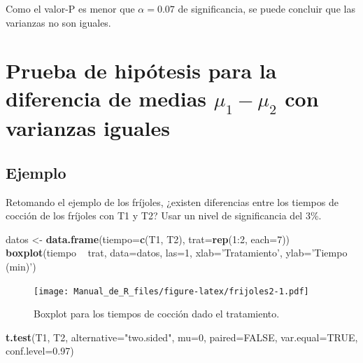\documentclass[10pt,]{krantz}
\makeatletter
\newenvironment{Shaded}{\begin{snugshade}}{\end{snugshade}}
\newcommand{\KeywordTok}[1]{\textcolor[rgb]{0.13,0.29,0.53}{\textbf{{#1}}}}
\newcommand{\DataTypeTok}[1]{\textcolor[rgb]{0.13,0.29,0.53}{{#1}}}
\newcommand{\DecValTok}[1]{\textcolor[rgb]{0.00,0.00,0.81}{{#1}}}
\newcommand{\FloatTok}[1]{\textcolor[rgb]{0.00,0.00,0.81}{{#1}}}
\newcommand{\StringTok}[1]{\textcolor[rgb]{0.31,0.60,0.02}{{#1}}}
\newcommand{\OtherTok}[1]{\textcolor[rgb]{0.56,0.35,0.01}{{#1}}}
\newcommand{\NormalTok}[1]{{#1}}
\newenvironment{kframe}{%
\medskip{}
\setlength{\fboxsep}{.8em}
 \def\at@end@of@kframe{}%
 \ifinner\ifhmode%
  \def\at@end@of@kframe{\end{minipage}}%
  \begin{minipage}{\columnwidth}%
 \fi\fi%
 \def\FrameCommand##1{\hskip\@totalleftmargin \hskip-\fboxsep
 \colorbox{shadecolor}{##1}\hskip-\fboxsep
     \hskip-\linewidth \hskip-\@totalleftmargin \hskip\columnwidth}%
 \MakeFramed {\advance\hsize-\width
   \@totalleftmargin\z@ \linewidth\hsize
   \@setminipage}}%
 {\par\unskip\endMakeFramed%
 \at@end@of@kframe}
\renewenvironment{Shaded}{\begin{kframe}}{\end{kframe}}
\makeatother
\begin{document}
Como el valor-P es menor que \(\alpha=0.07\) de significancia, se puede
concluir que las varianzas no son iguales.

\section{\texorpdfstring{Prueba de hipótesis para la diferencia de
medias \(\mu_1-\mu_2\) con varianzas
iguales}{Prueba de hipótesis para la diferencia de medias \textbackslash{}mu\_1-\textbackslash{}mu\_2 con varianzas iguales}}\label{prueba-de-hipotesis-para-la-diferencia-de-medias-mu_1-mu_2-con-varianzas-iguales}

\subsection*{Ejemplo}\label{ejemplo-67}


Retomando el ejemplo de los fríjoles, ¿existen diferencias entre los
tiempos de cocción de los fríjoles con T1 y T2? Usar un nivel de
significancia del 3\%.

\begin{Shaded}
\begin{Highlighting}[]
\NormalTok{datos <-}\StringTok{ }\KeywordTok{data.frame}\NormalTok{(}\DataTypeTok{tiempo=}\KeywordTok{c}\NormalTok{(T1, T2), }\DataTypeTok{trat=}\KeywordTok{rep}\NormalTok{(}\DecValTok{1}\NormalTok{:}\DecValTok{2}\NormalTok{, }\DataTypeTok{each=}\DecValTok{7}\NormalTok{))}
\KeywordTok{boxplot}\NormalTok{(tiempo ~}\StringTok{ }\NormalTok{trat, }\DataTypeTok{data=}\NormalTok{datos, }\DataTypeTok{las=}\DecValTok{1}\NormalTok{,}
        \DataTypeTok{xlab=}\StringTok{'Tratamiento'}\NormalTok{, }\DataTypeTok{ylab=}\StringTok{'Tiempo (min)'}\NormalTok{)}
\end{Highlighting}
\end{Shaded}

\begin{figure}[htbp]
\centering
\texttt{[image: Manual\_de\_R\_files/figure-latex/frijoles2-1.pdf]}
\caption{\label{fig:frijoles2}Boxplot para los tiempos de cocción dado el
tratamiento.}
\end{figure}

\begin{Shaded}
\begin{Highlighting}[]
\KeywordTok{t.test}\NormalTok{(T1, T2, }\DataTypeTok{alternative=}\StringTok{"two.sided"}\NormalTok{, }\DataTypeTok{mu=}\DecValTok{0}\NormalTok{, }
       \DataTypeTok{paired=}\OtherTok{FALSE}\NormalTok{, }\DataTypeTok{var.equal=}\OtherTok{TRUE}\NormalTok{, }\DataTypeTok{conf.level=}\FloatTok{0.97}\NormalTok{)}
\end{Highlighting}
\end{Shaded}
\end{document}
